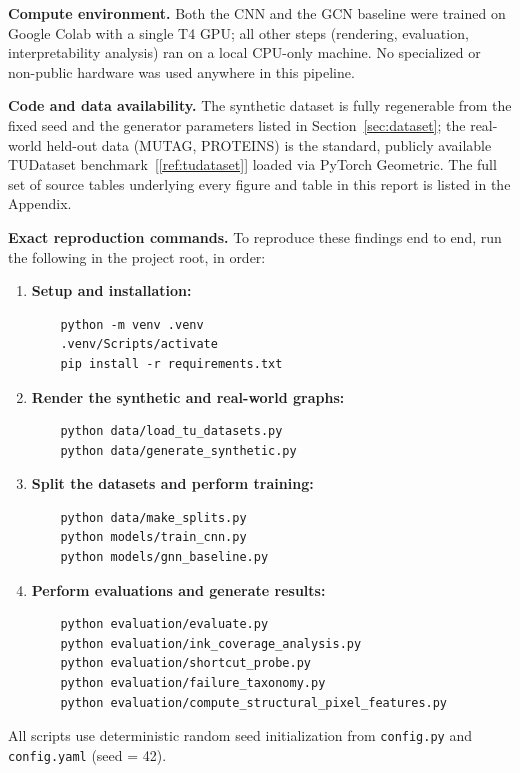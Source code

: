 \documentclass[11pt,letterpaper]{article}
\numberwithin{equation}{section}
\numberwithin{figure}{section}
\numberwithin{table}{section}
\begin{document}
\textbf{Compute environment.} Both the CNN and the GCN baseline were trained on Google Colab with a single T4 GPU; all other steps (rendering, evaluation, interpretability analysis) ran on a local CPU-only machine. No specialized or non-public hardware was used anywhere in this pipeline.

\textbf{Code and data availability.} The synthetic dataset is fully regenerable from the fixed seed and the generator parameters listed in Section~\ref{sec:dataset}; the real-world held-out data (MUTAG, PROTEINS) is the standard, publicly available TUDataset benchmark~[\ref{ref:tudataset}] loaded via PyTorch Geometric. The full set of source tables underlying every figure and table in this report is listed in the Appendix.

\textbf{Exact reproduction commands.} To reproduce these findings end to end, run the following in the project root, in order:
\begin{enumerate}
    \item \textbf{Setup and installation:}
    \begin{verbatim}
    python -m venv .venv
    .venv/Scripts/activate
    pip install -r requirements.txt
    \end{verbatim}
    \item \textbf{Render the synthetic and real-world graphs:}
    \begin{verbatim}
    python data/load_tu_datasets.py
    python data/generate_synthetic.py
    \end{verbatim}
    \item \textbf{Split the datasets and perform training:}
    \begin{verbatim}
    python data/make_splits.py
    python models/train_cnn.py
    python models/gnn_baseline.py
    \end{verbatim}
    \item \textbf{Perform evaluations and generate results:}
    \begin{verbatim}
    python evaluation/evaluate.py
    python evaluation/ink_coverage_analysis.py
    python evaluation/shortcut_probe.py
    python evaluation/failure_taxonomy.py
    python evaluation/compute_structural_pixel_features.py
    \end{verbatim}
\end{enumerate}
All scripts use deterministic random seed initialization from \texttt{config.py} and \texttt{config.yaml} (seed = 42).

\end{document}

